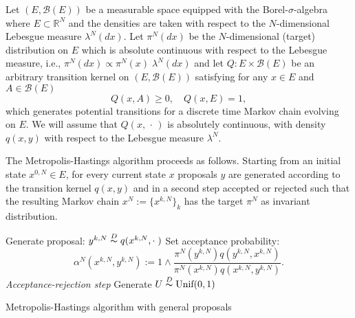 Let $ \left( E, \mathcal{B}(E) \right) $ be a measurable space equipped with the Borel-$\sigma$-algebra where $ E \subset \mathbb{R}^{N} $ and the densities are taken with respect to the $N$-dimensional Lebesgue measure $\lambda^{N}(dx)$. Let $ \pi^{N}(dx) $ be the $N$-dimensional (target) distribution on $ E $ which is absolute continuous with respect to the Lebesgue measure, i.e., $ \pi^{N}(dx) \varpropto \pi^{N}(x) \; \lambda^{N}(dx) $ and let $ Q : E \times \mathcal{B}(E) $ be an arbitrary transition kernel on $\left( E, \mathcal{B}(E) \right) $ satisfying for any $ x \in E $ and $ A \in \mathcal{B}(E) $
\begin{equation}
 Q(x,A) \geq 0, \quad Q(x, E) = 1,
\end{equation}
which generates potential transitions for a discrete time Markov chain evolving on $ E $.  We will assume that $ Q(x, \, \cdot \,) $ is absolutely continuous, with density $ q(x,y) $  with respect to the Lebesgue measure $ \lambda^{N}$.

The Metropolis-Hastings algorithm proceeds as follows. Starting from an initial state $ x^{0,N} \in E $, for every current state $x$ proposals $y$ are generated according to the transition kernel $ q (x, y) $ and in a second step accepted or rejected such that the resulting Markov chain $ x^{N} := \{ x^{k,N} \}_{k} $ has the target $ \pi^{N} $ as invariant distribution.


\IncMargin{1em}
\begin{algorithm}
\DontPrintSemicolon


\BlankLine

{
  Generate proposal: $ y^{k,N} \stackrel{D}{\thicksim} q(x^{k,N}, \cdot \;) $\;
  Set acceptance probability:
  \begin{equation*}
   \alpha^{N} ( x^{k,N}, y^{k,N} ) := 1 \wedge \dfrac{\pi^{N}(y^{k,N}) q(y^{k,N},x^{k,N}) }{\pi^{N}(x^{k,N}) q(x^{k,N},y^{k,N})}.    
  \end{equation*}\label{MHAlgo-AcceptanceProba}
  \emph{Acceptance-rejection step}\;
  Generate $ U \stackrel{D}{\thicksim} \text{Unif}(0,1) $\;

}
\caption{Metropolis-Hastings algorithm with general proposals}\label{Algo-MH}
\end{algorithm}\DecMargin{1em}

